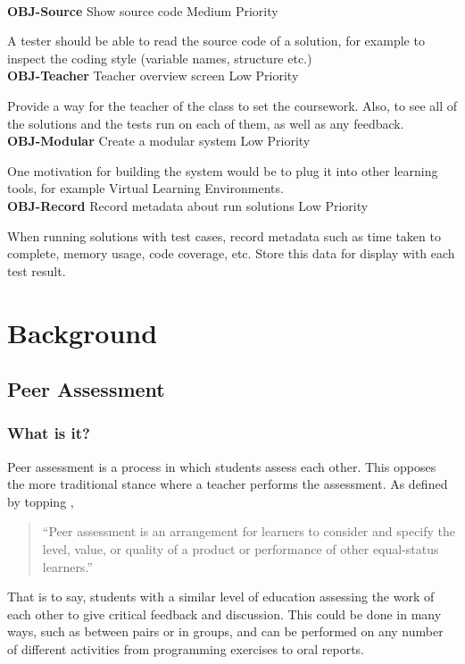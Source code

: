 \documentclass[a4paper,11pt]{report}
\newcommand{\objitem}[4]{\textbf{\\OBJ-#1} \quad #2 \hfill #3\par#4}
\begin{document}
\objitem{Source}{Show source code}{Medium Priority}{A tester should be able to read the source code of a solution, for example to inspect the coding style (variable names, structure etc.)}
\objitem{Teacher}{Teacher overview screen}{Low Priority}{Provide a way for the teacher of the class to set the coursework. Also, to see all of the solutions and the tests run on each of them, as well as any feedback.}
\objitem{Modular}{Create a modular system}{Low Priority}{One motivation for building the system would be to plug it into other learning tools, for example Virtual Learning Environments.}
\objitem{Record}{Record metadata about run solutions}{Low Priority}{When running solutions with test cases, record metadata such as time taken to complete, memory usage, code coverage, etc. Store this data for display with each test result.}


\chapter{Background}
\label{ch:bg}
\section{Peer Assessment}
\subsection{What is it?}
Peer assessment is a process in which students assess each other. This opposes the more traditional stance where a teacher performs the assessment. As defined by topping \cite{topping_peer_2009},
\begin{quote}
``Peer assessment is an arrangement for learners to consider and specify the level, value, or quality of a product or performance of other equal-status learners.''
\end{quote}
That is to say, students with a similar level of education assessing the work of each other to give critical feedback and discussion. This could be done in many ways, such as between pairs or in groups, and can be performed on any number of different activities from programming exercises to oral reports.\par
\end{document}
